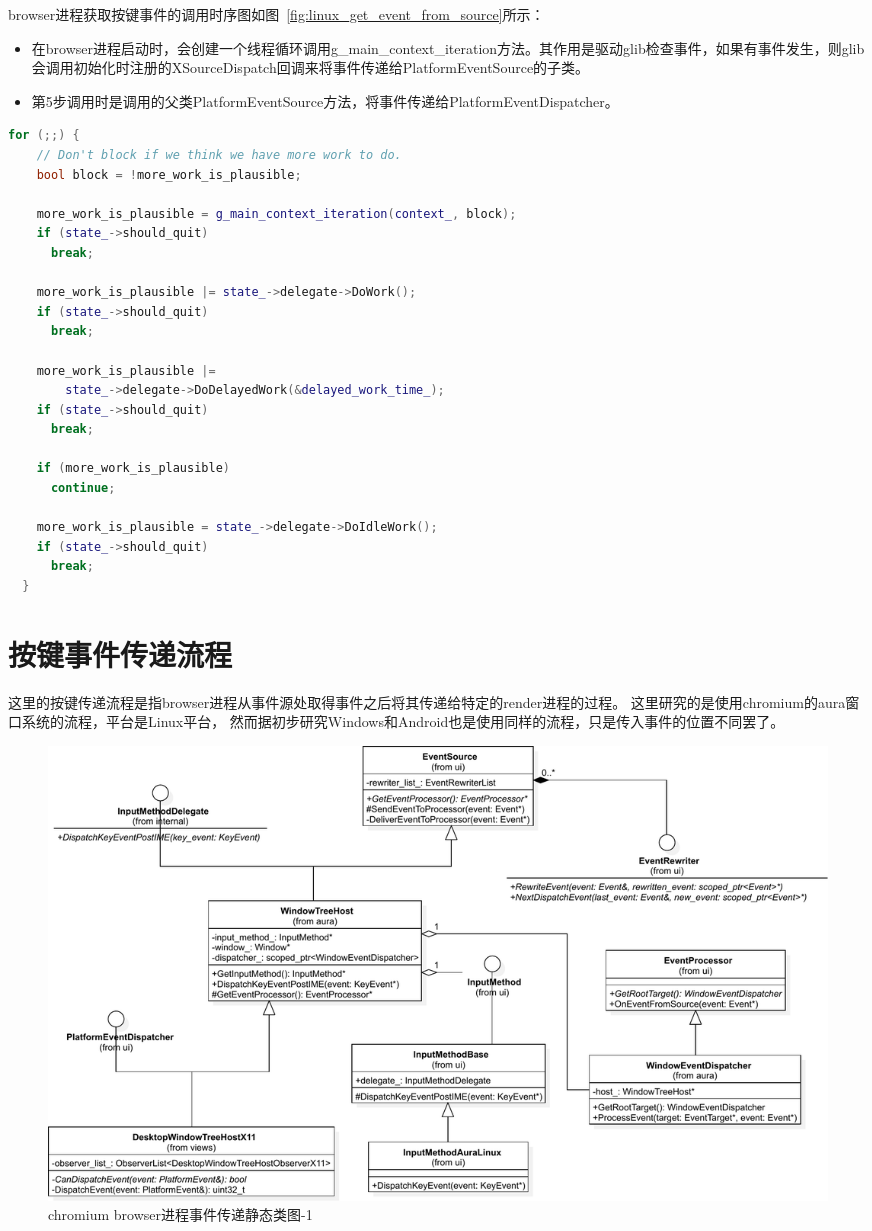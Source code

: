 browser进程获取按键事件的调用时序图如图~\ref{fig:linux_get_event_from_source}所示：
\begin{itemize}
  \item 在browser进程启动时，会创建一个线程循环调用g\_main\_context\_iteration方法。其作用是驱动glib检查事件，如果有事件发生，则glib会调用初始化时注册的XSourceDispatch回调来将事件传递给PlatformEventSource的子类。
  \item 第5步调用时是调用的父类PlatformEventSource方法，将事件传递给PlatformEventDispatcher。
\end{itemize}

\begin{spacing}{1.0}
\begin{lstlisting}[language={C++}]
  for (;;) {
    // Don't block if we think we have more work to do.
    bool block = !more_work_is_plausible;

    more_work_is_plausible = g_main_context_iteration(context_, block);
    if (state_->should_quit)
      break;

    more_work_is_plausible |= state_->delegate->DoWork();
    if (state_->should_quit)
      break;

    more_work_is_plausible |=
        state_->delegate->DoDelayedWork(&delayed_work_time_);
    if (state_->should_quit)
      break;

    if (more_work_is_plausible)
      continue;

    more_work_is_plausible = state_->delegate->DoIdleWork();
    if (state_->should_quit)
      break;
  }
\end{lstlisting}
\end{spacing}

\section{按键事件传递流程}
这里的按键传递流程是指browser进程从事件源处取得事件之后将其传递给特定的render进程的过程。
这里研究的是使用chromium的aura窗口系统的流程，平台是Linux平台，
然而据初步研究Windows和Android也是使用同样的流程，只是传入事件的位置不同罢了。


\begin{figure}[H] 
  \centering 
  \includegraphics[width=\textwidth]{image/event_study/browser_event_dispatch_class_1.pdf} 
  \caption{chromium browser进程事件传递静态类图-1} \label{fig:linux_event_dispatch_class_1} 
\end{figure}

